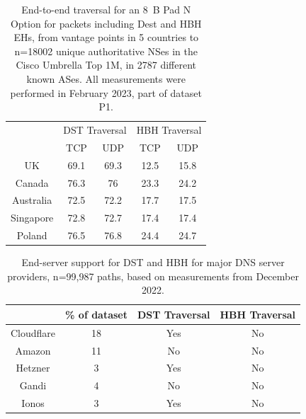 \documentclass[conference]{IEEEtran}
\begin{document}
\begin{table} 
\centering
\begin{tabular}{c|cc|cc}
\multicolumn{1}{l|}{} & \multicolumn{2}{c|}{DST Traversal} & \multicolumn{2}{c}{HBH Traversal} \\ \cline{2-5} 
\multicolumn{1}{l|}{} & \multicolumn{1}{c|}{TCP}       & UDP      & \multicolumn{1}{c|}{TCP}     & UDP     \\ \hline
UK                    & \multicolumn{1}{c|}{69.1}      & 69.3    & \multicolumn{1}{c|}{12.5}    & 15.8  \\ \hline
Canada                & \multicolumn{1}{c|}{76.3}      & 76     & \multicolumn{1}{c|}{23.3}    & 24.2  \\ \hline
Australia             & \multicolumn{1}{c|}{72.5}        & 72.2      & \multicolumn{1}{c|}{17.7}    & 17.5  \\ \hline
Singapore             & \multicolumn{1}{c|}{72.8}      & 72.7    & \multicolumn{1}{c|}{17.4}    & 17.4   \\ \hline
Poland                & \multicolumn{1}{c|}{76.5}      & 76.8   & \multicolumn{1}{c|}{24.4}    & 24.7   
\end{tabular}
\label{tbl:e2e_traversal}
\caption{End-to-end traversal for an 8~B Pad N Option for packets including Dest and HBH EHs, from vantage points in 5 countries to n=18002 unique authoritative NSes in the Cisco Umbrella Top 1M, in 2787 different known ASes. All measurements were performed in February 2023, part of dataset P1. }
\end{table}

\begin{table} 
\centering
\begin{tabular}{c|c|c|c}
           & \% of dataset &  DST Traversal & HBH Traversal\\
\hline
Cloudflare & 18                      & Yes                & No                 \\
\hline
Amazon     & 11                     & No                 & No                 \\
\hline
Hetzner    & 3                     & Yes                & No                 \\
\hline
Gandi      & 4                     & No                 & No                 \\
\hline
Ionos      & 3                    & Yes                & No                
\end{tabular}
\label{tbl:provider_support}
\caption{End-server support for DST and HBH for major DNS server providers, n=99,987 paths, based on measurements from December 2022. 
}
\end{table}
\end{document}

